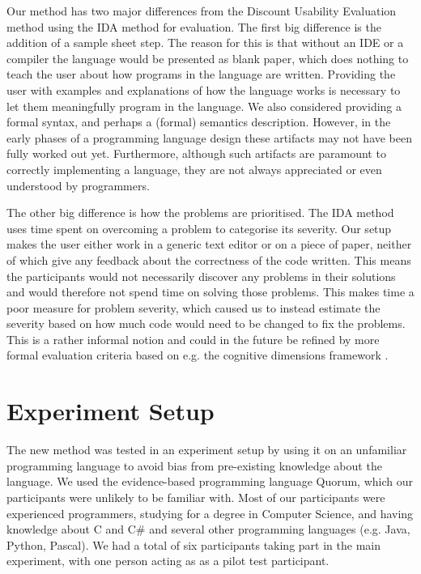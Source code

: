 \documentclass[10pt]{sigplanconf}
\begin{document}
Our method has two major differences from the Discount Usability Evaluation method using the IDA method for evaluation.
The first big difference is the addition of a sample sheet step. The reason for this is that without an IDE or a compiler the language would be presented as blank paper, which does nothing to teach the user about how programs in the language are written. Providing the user with examples and explanations of how the language works is necessary to let them meaningfully program in the language. We also considered providing a formal syntax, and perhaps a (formal) semantics description. However, in the early phases of a programming language design these artifacts may not have been fully worked out yet. Furthermore, although such artifacts are paramount to correctly implementing a language, they are not always appreciated or even understood by programmers. 

The other big difference is how the problems are prioritised. The IDA method uses time spent on overcoming a problem to categorise its severity. Our setup makes the user either work in a generic text editor or on a piece of paper, neither of which give any feedback about the correctness of the code written. This means the participants would not necessarily discover any problems in their solutions and would therefore not spend time on solving those problems.
This makes time a poor measure for problem severity, which caused us to instead estimate the severity based on how much code would need to be changed to fix the problems. This is a rather informal notion and could in the future be refined by more formal evaluation criteria based on e.g. the cognitive dimensions framework \cite{blackwell2001cognitive}.

\section{Experiment Setup}
The new method was tested in an experiment setup by using it on an unfamiliar programming language to avoid bias from pre-existing knowledge about the language. 
We used the evidence-based programming language Quorum, which our participants were unlikely to be familiar with. Most of our participants were experienced programmers,  studying for a degree in Computer Science, and having knowledge about C and C\# and several other programming languages (e.g. Java, Python, Pascal). We had a total of six participants taking part in the main experiment, with one person acting as as a pilot test participant.
\end{document}
